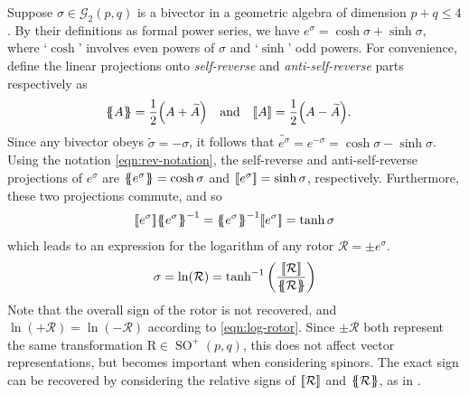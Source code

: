 \documentclass[12pt,a4paper]{article}
\newcommand{\GA}[1][]{\mathcal{G}_{#1}}
\newcommand{\rotor}[1]{\mathcal{#1}}
\newcommand{\linmap}[1]{\mathrm{#1}}
\newcommand{\rev}[1]{\widetilde{#1}}
\newcommand{\srev}[1]{\qty{\!\!\qty{#1}\!\!}}
\newcommand{\arev}[1]{\qty[\!\qty[#1]\!]}
\DeclareMathOperator{\SO}{SO}
\begin{document}
Suppose $\sigma{} \in \GA[2](p, q)$ is a bivector in a geometric algebra of dimension $p + q \leq{} 4$.
By their definitions as formal power series, we have
\begin{math}
	e^{\sigma{}} = \cosh \sigma{} + \sinh \sigma{}
,\end{math}
where `$\cosh$' involves even powers of $\sigma{}$ and `$\sinh$' odd powers.
For convenience, define the linear projections onto \emph{self-reverse} and \emph{anti-self-reverse} parts respectively as
\begin{align}
	\srev{A} &= \frac12\qty(A + \rev{A})
&	&\text{and}
&	\arev{A} &= \frac12\qty(A - \rev{A})
	\label{eqn:rev-notation}
.\end{align}
Since any bivector obeys $\rev{\sigma{}} = -\sigma{}$, it follows that $\rev{e^\sigma{}} = e^{-\sigma{}} = \cosh \sigma{} - \sinh \sigma{}$.
Using the notation \eqref{eqn:rev-notation}, the self-reverse and anti-self-reverse projections of $e^\sigma{}$ are $\srev{e^{\sigma{}}} = \cosh \sigma{}$ and $\arev{e^{\sigma{}}} = \sinh \sigma{}$, respectively.
Furthermore, these two projections commute, and so
\begin{align}
	{\arev{e^{\sigma{}}}}{\srev{e^{\sigma{}}}}^{-1} =
	{\srev{e^{\sigma{}}}}^{-1}{\arev{e^{\sigma{}}}} = \tanh \sigma{}
\end{align}
which leads to an expression for the logarithm of any rotor $\rotor R = \pm e^\sigma{}$.
\begin{align}
	\sigma{} = \ln(\rotor R) = \tanh^{-1}\qty(\frac{\arev{\rotor R}}{\srev{\rotor R}})
	\label{eqn:log-rotor}
\end{align}
Note that the overall sign of the rotor is not recovered, and $\ln(+\rotor R) = \ln(-\rotor R)$ according to \eqref{eqn:log-rotor}.
Since $\pm \rotor R$ both represent the same transformation $\linmap R \in \SO^+(p, q)$, this does not affect vector representations, but becomes important when considering spinors.
The exact sign can be recovered by considering the relative signs of $\arev{\rotor R}$ and $\srev{\rotor R}$, as in \cite[\textsection{}\,5.3]{lasenby2011ga-practical}.
\end{document}
